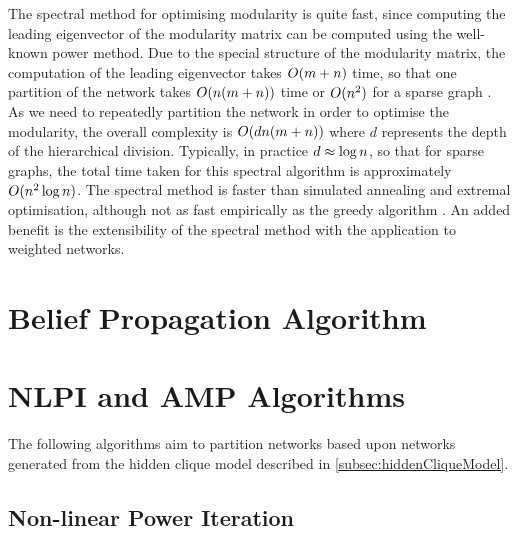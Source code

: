 The spectral method for optimising modularity is quite fast, since computing the leading eigenvector of the modularity matrix can be computed using the well-known power method.
Due to the special structure of the modularity matrix, the computation of the leading eigenvector takes $O(m+n)$ time, so that one partition of the network takes $O(n(m+n))$ time or $O(n^{2})$ for a sparse graph \cite{For10}.
As we need to repeatedly partition the network in order to optimise the modularity, the overall complexity is $O(dn(m+n))$ where $d$ represents the depth of the hierarchical division.
Typically, in practice $d \approx \log n$, so that for sparse graphs, the total time taken for this spectral algorithm is approximately $O(n^{2}\log n)$.
The spectral method is faster than simulated annealing and extremal optimisation, although not as fast empirically as the greedy algorithm \cite{For10}.
An added benefit is the extensibility of the spectral method with the application to weighted networks.


\section{Belief Propagation Algorithm}
\label{sec:beliefPropagationAlgorithm}



\section{NLPI and AMP Algorithms}
\label{sec:NLPIAndAMPAlgorithmsCommunityDetection}

The following algorithms aim to partition networks based upon networks generated from the hidden clique model described in \cref{subsec:hiddenCliqueModel}.


\subsection{Non-linear Power Iteration}
\label{subsec:nonLinearPowerIteration}

